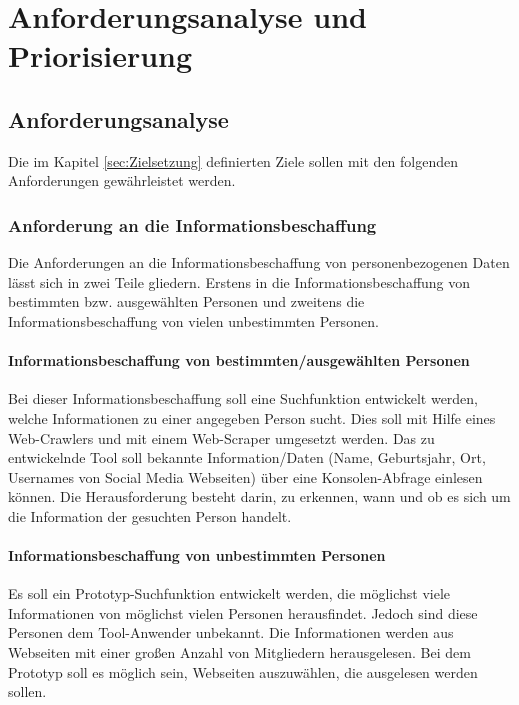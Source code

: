 
\chapter{Anforderungsanalyse und Priorisierung}  %
\label{cha:Anforderungsanalyse und Prioriesierung} %
\section{Anforderungsanalyse} %
\label{sec:Anforderunsanalyse} %
Die im Kapitel \ref{sec:Zielsetzung} definierten Ziele sollen mit den folgenden Anforderungen gewährleistet werden.

	\subsection{Anforderung an die Informationsbeschaffung}
	Die Anforderungen an die Informationsbeschaffung von personenbezogenen Daten lässt sich in zwei Teile gliedern. Erstens in die Informationsbeschaffung von bestimmten bzw. ausgewählten Personen und zweitens die Informationsbeschaffung von vielen unbestimmten Personen.
	
		\subsubsection{Informationsbeschaffung von bestimmten/ausgewählten Personen}
		Bei dieser Informationsbeschaffung soll eine Suchfunktion entwickelt werden, welche Informationen zu einer angegeben Person sucht. Dies soll mit Hilfe eines Web-Crawlers und mit einem Web-Scraper umgesetzt werden. Das zu entwickelnde Tool soll bekannte Information/Daten (Name, Geburtsjahr, Ort, Usernames von Social Media Webseiten) über eine Konsolen-Abfrage einlesen können. Die Herausforderung besteht darin, zu erkennen, wann und ob es sich um die Information der gesuchten Person handelt.
	
		\subsubsection{Informationsbeschaffung von unbestimmten Personen}
		Es soll ein Prototyp-Suchfunktion entwickelt werden, die möglichst viele Informationen von möglichst vielen Personen herausfindet. Jedoch sind diese Personen dem Tool-Anwender unbekannt. Die Informationen werden aus Webseiten mit einer großen Anzahl von Mitgliedern herausgelesen. Bei dem Prototyp soll es möglich sein, Webseiten auszuwählen, die ausgelesen werden sollen.
		
